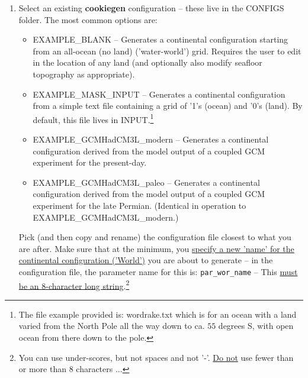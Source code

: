\begin{enumerate}

\vspace{2mm}
\item Select an existing \textbf{cookiegen} configuration -- these live in the \textsf{\footnotesize CONFIGS} folder. The most common options are:

\begin{itemize}[noitemsep]

\vspace{1mm}
\item \textsf{\footnotesize EXAMPLE\_BLANK} -- Generates a continental configuration starting from an all-ocean (no land) ('water-world') grid. Requires the user to edit in the location of any land (and optionally also modify seafloor topography as appropriate).

\vspace{1mm}
\item \textsf{\footnotesize EXAMPLE\_MASK\_INPUT} -- Generates a continental configuration from a simple text file containing a grid of '1's (ocean) and '0's (land). By default, this file lives in \textsf{\footnotesize INPUT}.\footnote{The file example provided is: \textsf{\footnotesize wordrake.txt} which is for an ocean with a land varied from the North Pole all the way down to ca. $55$ degrees S, with open ocean from there down to the pole.} 

\vspace{1mm}
\item \textsf{\footnotesize EXAMPLE\_GCMHadCM3L\_modern} -- Generates a continental configuration derived from the model output of a coupled GCM experiment for the present-day. 

\vspace{1mm}
\item \textsf{\footnotesize EXAMPLE\_GCMHadCM3L\_paleo} -- Generates a continental configuration derived from the model output of a coupled GCM experiment for the late Permian. (Identical in operation to \textsf{\footnotesize EXAMPLE\_GCMHadCM3L\_modern}.)

\end{itemize}

\vspace{1mm}
Pick (and then copy and rename) the configuration file closest to what you are after. Make sure that at the minimum, you \uline{specify a new 'name' for the continental configuration ('World')} you are about to generate -- in the configuration file, the parameter name for this is: \texttt{\small par\_wor\_name} -- This \uline{must be an 8-character long string}.\footnote{You can use under-scores, but not spaces and not '-'. \uline{Do not} use fewer than or more than 8 characters ...}


\end{enumerate}
